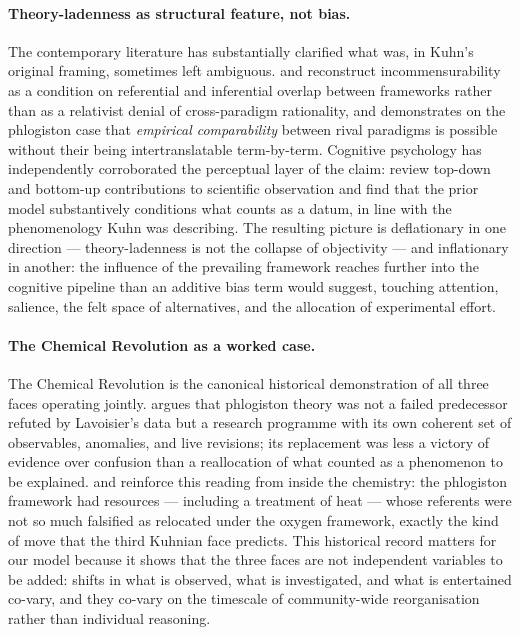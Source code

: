 \paragraph{Theory-ladenness as structural feature, not bias.}
The contemporary literature has substantially clarified what was, in
Kuhn's original framing, sometimes left ambiguous. \citet{Siegel1987_15}
and \citet{Malone1993_5} reconstruct incommensurability as a
condition on referential and inferential overlap between frameworks
rather than as a relativist denial of cross-paradigm rationality, and
\citet{Carrier2002_4} demonstrates on the phlogiston case that
\emph{empirical comparability} between rival paradigms is possible
without their being intertranslatable term-by-term. Cognitive
psychology has independently corroborated the perceptual layer of the
claim: \citet{Brewer2010_14} review top-down and bottom-up
contributions to scientific observation and find that the prior model
substantively conditions what counts as a datum, in line with the
phenomenology Kuhn was describing. The resulting picture is
deflationary in one direction --- theory-ladenness is not the
collapse of objectivity --- and inflationary in another: the
influence of the prevailing framework reaches further into the
cognitive pipeline than an additive bias term would suggest, touching
attention, salience, the felt space of alternatives, and the
allocation of experimental effort.

\paragraph{The Chemical Revolution as a worked case.}
The Chemical Revolution is the canonical historical demonstration of
all three faces operating jointly. \citet{Chang2012_9} argues that
phlogiston theory was not a failed predecessor refuted by Lavoisier's
data but a research programme with its own coherent set of
observables, anomalies, and live revisions; its replacement was less
a victory of evidence over confusion than a reallocation of what
counted as a phenomenon to be explained.
\citet{Lewowicz2011_2} and \citet{Boantza2008_4} reinforce this
reading from inside the chemistry: the phlogiston framework had
resources --- including a treatment of heat
\citep{Boantza2008_4} --- whose referents were not so much falsified
as relocated under the oxygen framework, exactly the kind of move
that the third Kuhnian face predicts. This historical record matters
for our model because it shows that the three faces are not
independent variables to be added: shifts in what is observed, what
is investigated, and what is entertained co-vary, and they co-vary
on the timescale of community-wide reorganisation rather than
individual reasoning.

